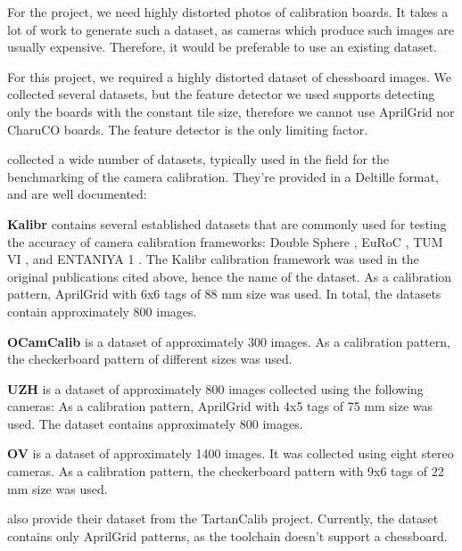 For the project, we need highly distorted photos of calibration boards. It takes
a lot of work to generate such a dataset, as cameras which produce such images are
usually expensive. Therefore, it would be preferable to use an existing dataset.

For this project, we required a highly distorted dataset of chessboard images.
We collected several datasets, but the feature detector we used supports
detecting only the boards with the constant tile size, therefore we cannot use
AprilGrid nor CharuCO boards. The feature detector is the only limiting factor.

\textcite{lochmanBabelCalibUniversalApproach2021} collected a wide number of
datasets, typically used in the field for the benchmarking of the camera
calibration. They're provided in a Deltille \cite{DeltilleDetector2023} format,
and are well documented:

\textbf{Kalibr} \citep{mayeSelfsupervisedCalibrationRobotic2013} contains several established datasets that are commonly used for testing
the accuracy of camera calibration frameworks: Double Sphere
\cite{usenkoDoubleSphereCamera2018}, EuRoC \cite{burriEuRoCMicroAerial2016}, TUM
VI \cite{schubertTUMVIBenchmark2018}, and ENTANIYA 1
\cite{Calibration250degFisheye}.
The Kalibr calibration framework was used in the
original publications cited above, hence the name of the dataset.
As a calibration pattern, AprilGrid with 6x6 tags of 88 mm size was used.
In total, the datasets contain approximately 800 images.

\textbf{OCamCalib} \citep{scaramuzzaFlexibleTechniqueAccurate2006} is a dataset
of approximately 300 images.
As a calibration pattern, the checkerboard pattern of different sizes was used.

\textbf{UZH} \citep{AreWeReady} is a dataset of approximately 800 images
collected using the following cameras:
As a calibration pattern, AprilGrid with 4x5 tags of 75 mm size was used.
The dataset contains approximately 800 images.

\textbf{OV} \citep{lochmanBabelCalibUniversalApproach2021} is a dataset of
approximately 1400 images. It was collected using eight stereo cameras.
As a calibration pattern, the checkerboard pattern with 9x6 tags of 22 mm size
was used.

\textcite{duisterhofTartanCalibIterativeWideAngle2022} also provide their
dataset from the TartanCalib project. Currently, the dataset contains only
AprilGrid patterns, as the toolchain doesn't support a chessboard.

